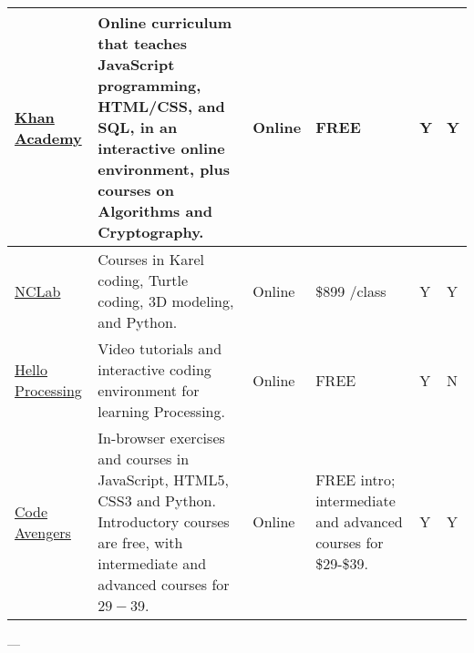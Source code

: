 \begin{longtable}{p{2cm}p{4cm}p{3cm}p{1.3cm}p{1.3cm}p{1.3cm}}
\href{https://www.khanacademy.org/computing/computer-science}{Khan Academy} & Online curriculum that teaches JavaScript programming, HTML/CSS, and SQL, in an interactive online environment, plus courses on Algorithms and Cryptography.  & Online & FREE & Y & Y \\ \hline
\href{https://nclab.com/karel/}{NCLab} & Courses in Karel coding, Turtle coding, 3D modeling, and Python. & Online & \$899 /class & Y & Y \\ \hline
\href{http://hello.processing.org/}{Hello Processing} & Video tutorials and interactive coding environment for learning Processing. & Online & FREE & Y & N \\ \hline
\href{https://www.codeavengers.com/teacher/info}{Code Avengers} & In-browser exercises and courses in JavaScript, HTML5, CSS3 and Python. Introductory courses are free, with intermediate and advanced courses for $29-$39.  & Online & FREE intro; intermediate and advanced courses for \$29-\$39.  & Y & Y \\ \hline
\end{longtable}	

---

